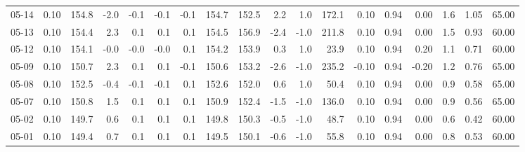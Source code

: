\begin{threeparttable}
{\begin{tabular}{lrrrrrrrrrrrrrrrrr}
  05-14 &     0.10 & 154.8 &              -2.0 &              -0.1 &               -0.1 &               -0.1 & 154.7 & 152.5 &        2.2 &                      1.0 &               172.1 &       0.10 &      0.94 &           0.00 &              1.6 &            1.05 &                  65.00 \\
  05-13 &     0.10 & 154.4 &               2.3 &               0.1 &                0.1 &                0.1 & 154.5 & 156.9 &       -2.4 &                     -1.0 &               211.8 &       0.10 &      0.94 &           0.00 &              1.5 &            0.93 &                  60.00 \\
  05-12 &     0.10 & 154.1 &              -0.0 &              -0.0 &               -0.0 &                0.1 & 154.2 & 153.9 &        0.3 &                      1.0 &                23.9 &       0.10 &      0.94 &           0.20 &              1.1 &            0.71 &                  60.00 \\
  05-09 &     0.10 & 150.7 &               2.3 &               0.1 &                0.1 &               -0.1 & 150.6 & 153.2 &       -2.6 &                     -1.0 &               235.2 &      -0.10 &      0.94 &          -0.20 &              1.2 &            0.76 &                  65.00 \\
  05-08 &     0.10 & 152.5 &              -0.4 &              -0.1 &               -0.1 &                0.1 & 152.6 & 152.0 &        0.6 &                      1.0 &                50.4 &       0.10 &      0.94 &           0.00 &              0.9 &            0.58 &                  65.00 \\
  05-07 &     0.10 & 150.8 &               1.5 &               0.1 &                0.1 &                0.1 & 150.9 & 152.4 &       -1.5 &                     -1.0 &               136.0 &       0.10 &      0.94 &           0.00 &              0.9 &            0.56 &                  65.00 \\
  05-02 &     0.10 & 149.7 &               0.6 &               0.1 &                0.1 &                0.1 & 149.8 & 150.3 &       -0.5 &                     -1.0 &                48.7 &       0.10 &      0.94 &           0.00 &              0.6 &            0.42 &                  60.00 \\
  05-01 &     0.10 & 149.4 &               0.7 &               0.1 &                0.1 &                0.1 & 149.5 & 150.1 &       -0.6 &                     -1.0 &                55.8 &       0.10 &      0.94 &           0.00 &              0.8 &            0.53 &                  60.00 \\

\end{tabular}}
\end{threeparttable}

